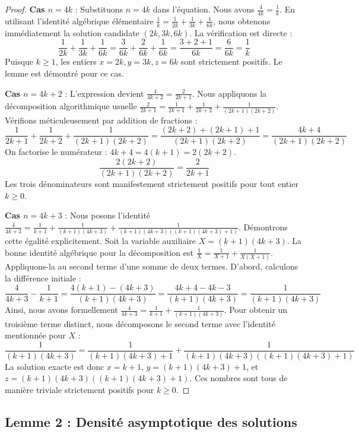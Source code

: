 \documentclass[11pt,a4paper]{article}
\begin{document}
\begin{proof}
\textbf{Cas $n = 4k$} : Substituons $n = 4k$ dans l'équation. Nous avons $\frac{4}{4k} = \frac{1}{k}$. En utilisant l'identité algébrique élémentaire $\frac{1}{k} = \frac{1}{2k} + \frac{1}{3k} + \frac{1}{6k}$, nous obtenons immédiatement la solution candidate $(2k, 3k, 6k)$. La vérification est directe :
$$ \frac{1}{2k} + \frac{1}{3k} + \frac{1}{6k} = \frac{3}{6k} + \frac{2}{6k} + \frac{1}{6k} = \frac{3+2+1}{6k} = \frac{6}{6k} = \frac{1}{k} $$
Puisque $k \ge 1$, les entiers $x=2k, y=3k, z=6k$ sont strictement positifs. Le lemme est démontré pour ce cas.

\textbf{Cas $n = 4k+2$} : L'expression devient $\frac{4}{4k+2} = \frac{2}{2k+1}$. Nous appliquons la décomposition algorithmique usuelle $\frac{2}{2k+1} = \frac{1}{2k+1} + \frac{1}{2k+2} + \frac{1}{(2k+1)(2k+2)}$.
Vérifions méticuleusement par addition de fractions :
$$ \frac{1}{2k+1} + \frac{1}{2k+2} + \frac{1}{(2k+1)(2k+2)} = \frac{(2k+2) + (2k+1) + 1}{(2k+1)(2k+2)} = \frac{4k+4}{(2k+1)(2k+2)} $$
On factorise le numérateur : $4k+4 = 4(k+1) = 2(2k+2)$.
$$ \frac{2(2k+2)}{(2k+1)(2k+2)} = \frac{2}{2k+1} $$
Les trois dénominateurs sont manifestement strictement positifs pour tout entier $k \ge 0$.

\textbf{Cas $n = 4k+3$} : Nous posons l'identité $\frac{4}{4k+3} = \frac{1}{k+1} + \frac{1}{(k+1)(4k+3)} + \frac{1}{(k+1)(4k+3)((k+1)(4k+3)+1)}$.
Démontrons cette égalité explicitement. Soit la variable auxiliaire $X = (k+1)(4k+3)$. La bonne identité algébrique pour la décomposition est $\frac{1}{X} = \frac{1}{X+1} + \frac{1}{X(X+1)}$.
Appliquons-la au second terme d'une somme de deux termes. D'abord, calculons la différence initiale :
$$ \frac{4}{4k+3} - \frac{1}{k+1} = \frac{4(k+1) - (4k+3)}{(k+1)(4k+3)} = \frac{4k+4-4k-3}{(k+1)(4k+3)} = \frac{1}{(k+1)(4k+3)} $$
Ainsi, nous avons formellement $\frac{4}{4k+3} = \frac{1}{k+1} + \frac{1}{(k+1)(4k+3)}$. Pour obtenir un troisième terme distinct, nous décomposons le second terme avec l'identité mentionnée pour $X$ :
$$ \frac{1}{(k+1)(4k+3)} = \frac{1}{(k+1)(4k+3)+1} + \frac{1}{(k+1)(4k+3)((k+1)(4k+3)+1)} $$
La solution exacte est donc $x = k+1$, $y = (k+1)(4k+3)+1$, et $z = (k+1)(4k+3)((k+1)(4k+3)+1)$. Ces nombres sont tous de manière triviale strictement positifs pour $k \ge 0$.
\end{proof}

\subsection{Lemme 2 : Densité asymptotique des solutions}
\end{document}
